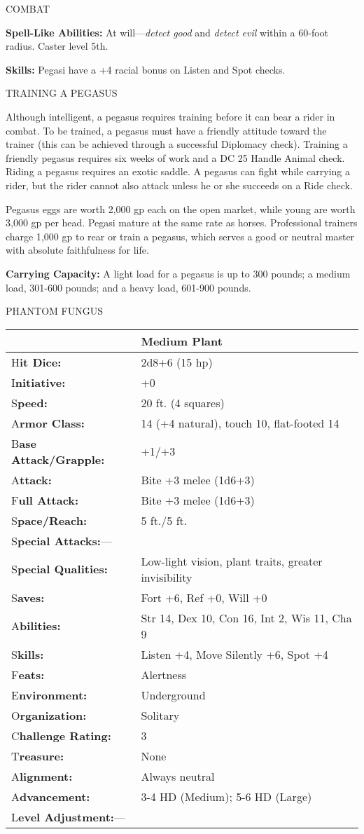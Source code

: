 \documentclass{article}
\begin{document}
COMBAT

\textbf{Spell-Like Abilities:} At will---\textit{detect good }and \textit{detect 
evil }within a 60-foot radius. Caster level 5th.

\textbf{Skills:} Pegasi have a +4 racial bonus on Listen and Spot checks.

TRAINING A PEGASUS

Although intelligent, a pegasus requires training before it can bear a rider in 
combat. To be trained, a pegasus must have a friendly attitude toward the trainer 
(this can be achieved through a successful Diplomacy check). Training a friendly 
pegasus requires six weeks of work and a DC 25 Handle Animal check. Riding a pegasus 
requires an exotic saddle. A pegasus can fight while carrying a rider, but the 
rider cannot also attack unless he or she succeeds on a Ride check.

Pegasus eggs are worth 2,000 gp each on the open market, while young are worth 
3,000 gp per head. Pegasi mature at the same rate as horses. Professional trainers 
charge 1,000 gp to rear or train a pegasus, which serves a good or neutral master 
with absolute faithfulness for life.

\textbf{Carrying Capacity:} A light load for a pegasus is up to 300 pounds; a medium 
load, 301-600 pounds; and a heavy load, 601-900 pounds.

\vspace{12pt}
{\LARGE{}PHANTOM FUNGUS}

\begin{tabular}{|>{\raggedright}p{91pt}|>{\raggedright}p{191pt}|}
\hline
  & Medium Plant\tabularnewline
\hline
H\textbf{it Dice:} & 2d8+6 (15 hp)\tabularnewline
\hline
I\textbf{nitiative:} & +0\tabularnewline
\hline
S\textbf{peed:} & 20 ft. (4 squares)\tabularnewline
\hline
A\textbf{rmor Class:} & 14 (+4 natural), touch 10, flat-footed 14\tabularnewline
\hline
B\textbf{ase Attack/Grapple:} & +1/+3\tabularnewline
\hline
A\textbf{ttack:} & Bite +3 melee (1d6+3)\tabularnewline
\hline
F\textbf{ull Attack:} & Bite +3 melee (1d6+3)\tabularnewline
\hline
S\textbf{pace/Reach:} & 5 ft./5 ft.\tabularnewline
\hline
S\textbf{pecial Attacks:}--- & \tabularnewline
\hline
S\textbf{pecial Qualities:} & Low-light vision, plant traits, greater invisibility\tabularnewline
\hline
S\textbf{aves:} & Fort +6, Ref +0, Will +0\tabularnewline
\hline
A\textbf{bilities:} & Str 14, Dex 10, Con 16, Int 2, Wis 11, Cha 9\tabularnewline
\hline
S\textbf{kills:} & Listen +4, Move Silently +6, Spot +4\tabularnewline
\hline
F\textbf{eats:} & Alertness\tabularnewline
\hline
E\textbf{nvironment:} & Underground\tabularnewline
\hline
O\textbf{rganization:} & Solitary\tabularnewline
\hline
C\textbf{hallenge Rating:} & 3\tabularnewline
\hline
T\textbf{reasure:} & None\tabularnewline
\hline
A\textbf{lignment:} & Always neutral\tabularnewline
\hline
A\textbf{dvancement:} & 3-4 HD (Medium); 5-6 HD (Large)\tabularnewline
\hline
L\textbf{evel Adjustment:}--- & \tabularnewline
\hline
\end{tabular}
\end{document}

